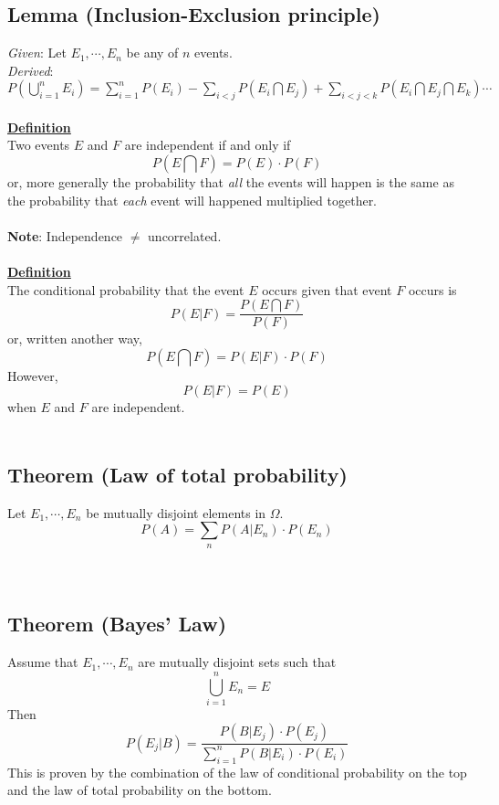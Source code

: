 \documentclass[12pt]{article}
\newcommand{\aside}[1]{\noindent\textbf{\underline{#1}}}
\begin{document}
\subsection{Lemma (Inclusion-Exclusion principle)} 
\textit{Given}: Let $E_1, \cdots, E_n$ be any of $n$ events.
\\
\textit{Derived}: $P(\bigcup \limits_{i=1}^{n} E_i) = \sum\limits_{i=1}^{n} P(E_i) - \sum\limits_{i < j} P(E_i \bigcap E_j) + \sum\limits_{i < j < k} P(E_i \bigcap E_j \bigcap E_k) \cdots$
\\ \\
\aside{Definition} \\

Two events $E$ and $F$ are independent if and only if \[P(E \bigcap F) = P(E) \cdot P(F)\] or, more generally the probability that \textit{all} the events will happen is the same as the probability that \textit{each} event will happened multiplied together.
\\ \\
\textbf{Note}: Independence $\neq$ uncorrelated.
\\ \\
\aside{Definition} \\

The conditional probability that the event $E$ occurs given that event $F$ occurs is \[P(E | F) = \frac{P(E \bigcap F)}{P(F)}\] or, written another way, \[P(E \bigcap F) = P(E | F) \cdot P(F)\]However, \[P(E | F) = P(E)\] when $E$ and $F$ are independent. \\ \\

\subsection{Theorem (Law of total probability)}

Let $E_1, \cdots, E_n$ be mutually disjoint elements in $\Omega$. \[P(A) = \sum \limits_{n} P(A | E_n) \cdot P(E_n)\] \\ \\

\subsection{Theorem (Bayes' Law)}

Assume that $E_1, \cdots, E_n$ are mutually disjoint sets such that \[\bigcup \limits_{i=1}^{n} E_n = E\]Then \[P(E_j | B) = \frac{P(B | E_j) \cdot P(E_j)}{\sum \limits_{i=1}^{n} P(B | E_i) \cdot P(E_i)}\]This is proven by the combination of the law of conditional probability on the top and the law of total probability on the bottom.
\\ \\
\end{document}
